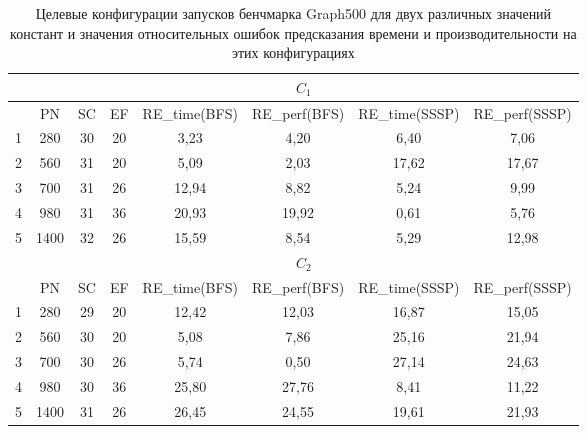 		\begin{table}
			\centering
			\begin{tabular}{|r||c|c|c|c|c|c|c|}
				\hline
				            & \multicolumn{7}{c|}{\(C_1\)}                                                     \\ \hline
				            & PN   & SC & EF & RE\_time(BFS) & RE\_perf(BFS) & RE\_time(SSSP) & RE\_perf(SSSP) \\ \hline
				1           & 280  & 30 & 20 &          3,23 &          4,20 &           6,40 & 7,06           \\ \hline
				2           & 560  & 31 & 20 &          5,09 &          2,03 &          17,62 & 17,67          \\ \hline
				3           & 700  & 31 & 26 &         12,94 &          8,82 &           5,24 & 9,99           \\ \hline
				4           & 980  & 31 & 36 &         20,93 &         19,92 &           0,61 & 5,76           \\ \hline
				5           & 1400 & 32 & 26 &         15,59 &          8,54 &           5,29 & 12,98          \\ \hhline{|=||=|=|=|=|=|=|=|} 
				            & \multicolumn{7}{c|}{\(C_2\)}                                                     \\ \hline
				\textnumero & PN   & SC & EF & RE\_time(BFS) & RE\_perf(BFS) & RE\_time(SSSP) & RE\_perf(SSSP) \\ \hline
				1           & 280  & 29 & 20 &         12,42 &         12,03 &          16,87 & 15,05          \\ \hline
				2           & 560  & 30 & 20 &          5,08 &          7,86 &          25,16 & 21,94          \\ \hline  
				3           & 700  & 30 & 26 &          5,74 &          0,50 &          27,14 & 24,63          \\ \hline
				4           & 980  & 30 & 36 &         25,80 &         27,76 &           8,41 & 11,22          \\ \hline
				5           & 1400 & 31 & 26 &         26,45 &         24,55 &          19,61 & 21,93          \\ \hline

				              
			\end{tabular}
			\caption{Целевые конфигурации запусков бенчмарка Graph500 для двух различных значений констант и значения относительных ошибок предсказания времени и производительности на этих конфигурациях}
			\label{targer_Graph500}
		\end{table}

